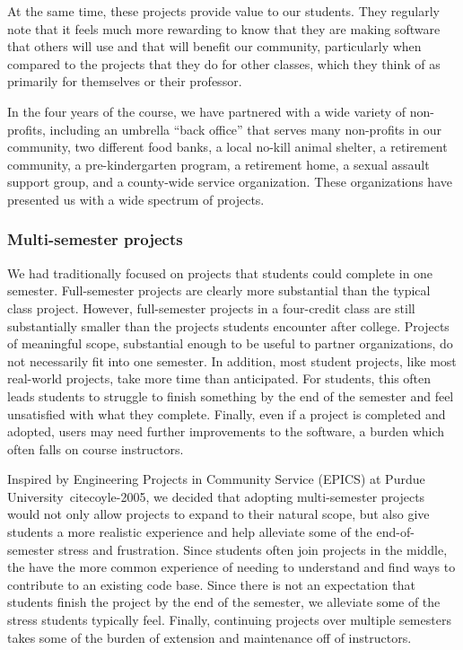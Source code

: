 At the same time, these projects provide value to our students.  They
regularly note that it feels much more rewarding to know that they are
making software that others will use and that will benefit our community,
particularly when compared to the projects that they do for other classes,
which they think of as primarily for themselves or their professor.

In the four years of the course, we have partnered with a wide
variety of non-profits, including an umbrella ``back office'' that
serves many non-profits in our community, two different food banks,
a local no-kill animal shelter, a retirement community, a
pre-kindergarten program, a retirement home, a sexual assault support
group, and a county-wide service organization.  These organizations
have presented us with a wide spectrum of projects.

\subsubsection{Multi-semester projects}

We had traditionally focused on projects that students could complete
in one semester.  Full-semester projects are clearly more substantial
than the typical class project.  However, full-semester projects
in a four-credit class are still substantially smaller than the
projects students encounter after college. 
Projects of meaningful scope, substantial enough to be useful to 
partner organizations, do not necessarily fit into one semester. 
In addition, most student projects, like most real-world projects,
take more time than anticipated.  For students, this often leads
students to struggle to finish something by the end of the semester and 
feel unsatisfied with what they complete.
Finally, even if a project is completed and adopted, 
users may need further improvements to the software, a burden 
which often falls on course instructors.

Inspired by Engineering Projects in Community Service (EPICS) at 
Purdue University~cite{coyle-2005}, 
we decided that adopting multi-semester projects would not only 
allow projects to expand to their natural scope, but also
give students a more realistic experience and help
alleviate some of the end-of-semester stress and frustration.  Since
students often join projects in the middle, the have the more common
experience of needing to understand and find ways to contribute to
an existing code base.  Since there is not an expectation that
students finish the project by the end of the semester, we alleviate
some of the stress students typically feel. Finally, continuing projects
over multiple semesters takes some of the burden of 
extension and maintenance off of instructors.

